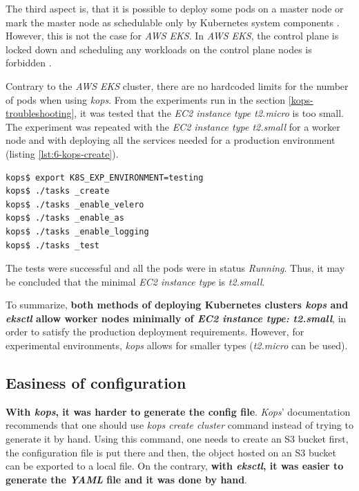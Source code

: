 The third aspect is, that it is possible to deploy some pods on a master node or mark the master node as schedulable only by Kubernetes system components \cite{k8s-adv-sch}. However, this is not the case for \textit{AWS EKS}. In \textit{AWS EKS}, the control plane is locked down and scheduling any workloads on the control plane nodes is forbidden \cite{k8s-eks-master-no-schedulable}.



Contrary to the \textit{AWS EKS} cluster, there are no hardcoded limits for the number of pods when using \textit{kops}. From the experiments run in the section \ref{kops-troubleshooting}, it was tested that the \textit{EC2 instance type t2.micro} is too small. The experiment was repeated with  the \textit{EC2 instance type t2.small} for a worker node and with deploying all the services needed for a production environment (listing \ref{lst:6-kops-create}).
\begin{lstlisting}[basicstyle=\scriptsize,xleftmargin=0cm,label=lst:6-kops-create,caption={Deploying a production ready \textit{kops} cluster},captionpos=b,language=Bash]
kops$ export K8S_EXP_ENVIRONMENT=testing
kops$ ./tasks _create
kops$ ./tasks _enable_velero
kops$ ./tasks _enable_as
kops$ ./tasks _enable_logging
kops$ ./tasks _test
\end{lstlisting}

The tests were successful and all the pods were in status \textit{Running}. Thus, it may be concluded that the minimal \textit{EC2 instance type} is \textit{t2.small}.

To summarize, \textbf{both methods of deploying Kubernetes clusters \textit{kops} and \textit{eksctl} allow worker nodes minimally of \textit{EC2 instance type: t2.small}}, in order to satisfy the production deployment requirements. However, for experimental environments, \textit{kops} allows for smaller types (\textit{t2.micro} can be used).

\subsection{Easiness of configuration}

\textbf{With \textit{kops}, it was harder to generate the config file}. \textit{Kops}' documentation recommends that one should use \textit{kops create cluster} command instead of trying to generate it by hand. Using this command, one needs to create an S3 bucket first, the configuration file is put there and then, the object hosted on an S3 bucket can be exported to a local file. On the contrary, \textbf{with \textit{eksctl}, it was easier to generate the \textit{YAML} file and it was done by hand}.

